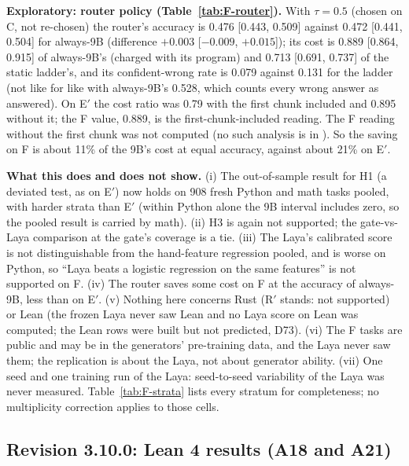 \documentclass[11pt,a4paper]{article}
\newcommand{\code}[1]{\texttt{\detokenize{#1}}}
\begin{document}
\textbf{Exploratory: router policy (Table~\ref{tab:F-router}).} With $\tau=0.5$ (chosen on C, not re-chosen) the router's accuracy is 0.476 [0.443, 0.509] against 0.472 [0.441, 0.504] for always-9B (difference $+0.003$ [$-0.009$, $+0.015$]); its cost is 0.889 [0.864, 0.915] of always-9B's (charged with its program) and 0.713 [0.691, 0.737] of the static ladder's, and its confident-wrong rate is 0.079 against 0.131 for the ladder (not like for like with always-9B's 0.528, which counts every wrong answer as answered). On E$'$ the cost ratio was 0.79 with the first chunk included and 0.895 without it; the F value, 0.889, is the first-chunk-included reading. The F reading without the first chunk was not computed (no such analysis is in \code{numbers_F_laya.json}). So the saving on F is about 11\% of the 9B's cost at equal accuracy, against about 21\% on E$'$.

\textbf{What this does and does not show.} (i) The out-of-sample result for H1 (a deviated test, as on E$'$) now holds on 908 fresh Python and math tasks pooled, with harder strata than E$'$ (within Python alone the 9B interval includes zero, so the pooled result is carried by math). (ii) H3 is again not supported; the gate-vs-Laya comparison at the gate's coverage is a tie. (iii) The Laya's calibrated score is not distinguishable from the hand-feature regression pooled, and is worse on Python, so ``Laya beats a logistic regression on the same features'' is not supported on F. (iv) The router saves some cost on F at the accuracy of always-9B, less than on E$'$. (v) Nothing here concerns Rust (R$'$ stands: not supported) or Lean (the frozen Laya never saw Lean and no Laya score on Lean was computed; the Lean rows were built but not predicted, D73). (vi) The F tasks are public and may be in the generators' pre-training data, and the Laya never saw them; the replication is about the Laya, not about generator ability. (vii) One seed and one training run of the Laya: seed-to-seed variability of the Laya was never measured. Table~\ref{tab:F-strata} lists every stratum for completeness; no multiplicity correction applies to those cells.

\subsection{Revision 3.10.0: Lean 4 results (A18 and A21)}\label{sec:lean3100}
\end{document}

